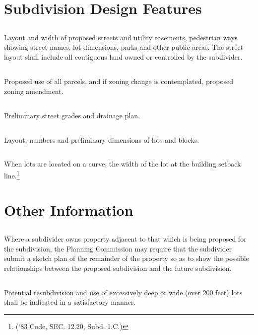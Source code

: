 \section{Subdivision Design Features}
\subsection{}
Layout and width of proposed streets and utility easements, pedestrian ways showing street names, lot dimensions, parks and other public areas. The street layout shall include all contiguous land owned or controlled by the subdivider.
\subsection{}
Proposed use of all parcels, and if zoning change is contemplated, proposed zoning amendment.
\subsection{}
Preliminary street grades and drainage plan.
\subsection{}
Layout, numbers and preliminary dimensions of lots and blocks.
\subsection{}
When lots are located on a curve, the width of the lot at the building setback line.\footnote{(‘83 Code, SEC. 12.20, Subd. 1.C.)}

\section{Other Information}
\subsection{}
Where a subdivider owns property adjacent to that which is being proposed for the subdivision, the Planning Commission may require that the subdivider submit a sketch plan of the remainder of the property so as to show the possible relationships between the proposed subdivision and the future subdivision.
\subsection{}
Potential resubdivision and use of excessively deep or wide (over 200 feet) lots shall be indicated in a satisfactory manner.

